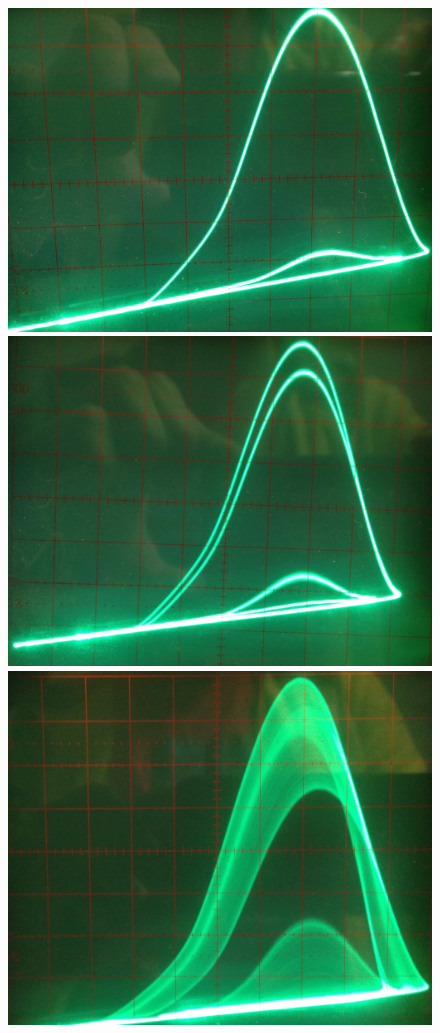 \documentclass[11,5pt, twoside]{article}
\begin{document}
\begin{figure}[!htbp]
\centering
\includegraphics[scale=0.05]{800khz-134V-phase}
\includegraphics[scale=0.055]{800khz-112V-phase}
\includegraphics[scale=0.06]{800khz-29,6V-phase-chaos}

\end{figure}
\end{document}
